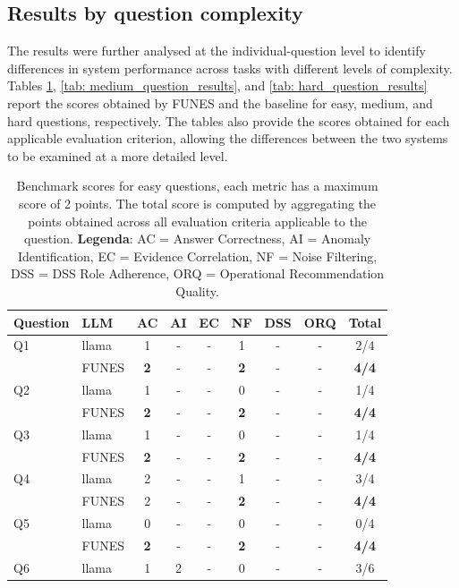 \subsection{Results by question complexity}
The results were further analysed at the individual-question level to identify differences in system performance across tasks with different levels of complexity. Tables \ref{tab: easy_question_results}, \ref{tab: medium_question_results}, and \ref{tab: hard_question_results} report the scores obtained by FUNES and the baseline for easy, medium, and hard questions, respectively. The tables also provide the scores obtained for each applicable evaluation criterion, allowing the differences between the two systems to be examined at a more detailed level.

\begin{table}[htbp]
\centering
\caption{Benchmark scores for easy questions, each metric has a maximum score of 2 points. The total score is computed by aggregating the points obtained across all evaluation criteria applicable to the question. \textbf{Legenda}: AC = Answer Correctness, AI = Anomaly Identification, EC = Evidence Correlation, NF = Noise Filtering, DSS = DSS Role Adherence, ORQ = Operational Recommendation Quality.}
\label{tab: easy_question_results}
\begin{tabular}{llccccccc}
\toprule
\textbf{Question} & \textbf{LLM} & \textbf{AC} & \textbf{AI} & \textbf{EC} & \textbf{NF} & \textbf{DSS} & \textbf{ORQ} & \textbf{Total} \\
\midrule
Q1 & llama & 1 & - & - & 1 & - & - & 2/4 \\
   & FUNES & \textbf{2} & - & - & \textbf{2} & - & - & \textbf{4/4} \\
\hline
Q2 & llama & 1 & - & - & 0 & - & - & 1/4 \\
   & FUNES & \textbf{2} & - & - & \textbf{2} & - & - & \textbf{4/4} \\
\hline
Q3 & llama & 1 & - & - & 0 & - & - & 1/4 \\
   & FUNES & \textbf{2} & - & - & \textbf{2} & - & - & \textbf{4/4} \\
\hline
Q4 & llama & 2 & - & - & 1 & - & - & 3/4 \\
   & FUNES & 2 & - & - & \textbf{2} & - & - & \textbf{4/4} \\
\hline
Q5 & llama & 0 & - & - & 0 & - & - & 0/4 \\
   & FUNES & \textbf{2} & - & - & \textbf{2} & - & - & \textbf{4/4} \\
\hline
Q6 & llama & 1 & 2 & - & 0 & - & - & 3/6 \\

\end{tabular}
\end{table}
